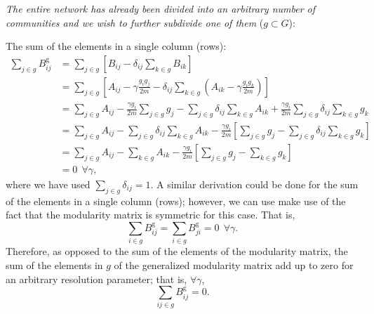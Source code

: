 \documentclass[pdflatex,sn-mathphys-num]{sn-jnl}%
\begin{document}
\textit{The entire network has already been divided into an arbitrary number of communities and we wish to further subdivide one of them} ($g \subset G$):

The sum of the elements in a single column (rows):
\begin{equation}\label{eq_A:gen_sym_und_cols_g}
    \begin{split}
    \sum_{j \in g} B^{\text{g}}_{ij} & = \sum_{j \in g} \left[ B_{ij} - \delta_{ij}\sum_{k \in g} B_{ik} \right ] \\
    & = \sum_{j \in g} \left[ A_{ij} - \gamma \frac{g_i g_j}{2m} - \delta_{ij}\sum_{k \in g} \left( A_{ik} - \gamma \frac{g_i g_k}{2m}\right) \right ] \\
    & = \sum_{j \in g} A_{ij} - \frac{\gamma g_i}{2m} \sum_{j \in g}g_j - \sum_{j \in g} \delta_{ij}\sum_{k \in g} A_{ik} + \frac{\gamma g_i}{2m}\sum_{j \in g} \delta_{ij} \sum_{k \in g} g_k \\
    &= \sum_{j \in g} A_{ij} - \sum_{j \in g} \delta_{ij}\sum_{k \in g} A_{ik} - \frac{\gamma g_i}{2m} \left[ \sum_{j \in g}g_j - \sum_{j \in g} \delta_{ij} \sum_{k \in g} g_k \right] \\
    &= \sum_{j \in g} A_{ij} - \sum_{k \in g} A_{ik} - \frac{\gamma g_i}{2m} \left[ \sum_{j \in g}g_j - \sum_{k \in g} g_k \right] \\
    & = 0 \ \ \forall \gamma,
    \end{split}
\end{equation} where we have used $\sum_{j \in g}\delta_{ij}=1$. A similar derivation could be done for the sum of the elements in a single column (rows); however, we can use make use of the fact that the modularity matrix is symmetric for this case. That is,
\begin{equation}\label{eq_A:gen_sym_und_rows_g}
    \sum_{i \in g} B^{\text{g}}_{ij} = \sum_{i \in g} B^{\text{g}}_{ji} = 0 \ \ \forall \gamma.
\end{equation} Therefore, as opposed to the sum of the elements of the modularity matrix, the sum of the elements in $g$ of the generalized modularity matrix add up to zero for an arbitrary resolution parameter; that is, $\forall \gamma$,
\begin{equation} \label{eq_A:gen_sym_und_elements_g}
    \sum_{ij \in g}B^{\text{g}}_{ij}=0.
\end{equation} 
\end{document}
